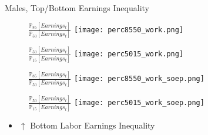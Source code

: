 \documentclass{beamer}
\begin{document}
\begin{frame}{Males, Top/Bottom Earnings Inequality}
\begin{figure}[!t]
\centering
\begin{minipage}[b]{0.32\textwidth}{$\frac{\mathbb{P}_{85}[Earnings_t]}{\mathbb{P}_{50}[Earnings_t]}$}
\centering
\texttt{[image: perc8550\_work.png]}
\end{minipage}
\begin{minipage}[b]{0.32\textwidth}{$\frac{\mathbb{P}_{50}[Earnings_t]}{\mathbb{P}_{15}[Earnings_t]}$}
\centering
\texttt{[image: perc5015\_work.png]}
\end{minipage}
\end{figure}
\begin{figure}[!t]
\centering
\begin{minipage}[b]{0.32\textwidth}{$\frac{\mathbb{P}_{85}[Earnings_t]}{\mathbb{P}_{50}[Earnings_t]}$}
\centering
\texttt{[image: perc8550\_work\_soep.png]}
\end{minipage}
\begin{minipage}[b]{0.32\textwidth}{$\frac{\mathbb{P}_{50}[Earnings_t]}{\mathbb{P}_{15}[Earnings_t]}$}
\centering
\texttt{[image: perc5015\_work\_soep.png]}
\end{minipage}
\end{figure}
\begin{itemize}
\setlength{\itemsep}{0.7 cm}
\item $\uparrow$ Bottom Labor Earnings Inequality
\end{itemize}
\end{frame}
\end{document}
